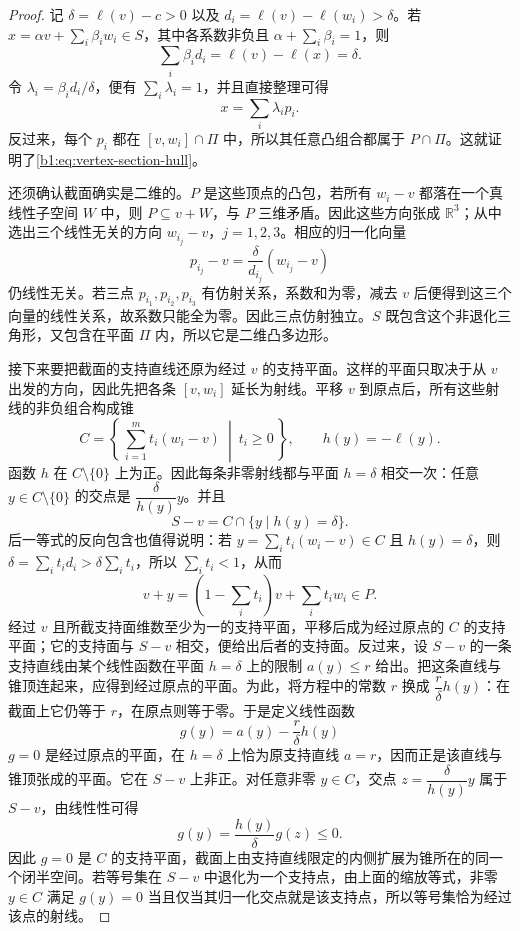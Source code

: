 \begin{proof}
	记 \(\delta=\ell(v)-c>0\) 以及 \(d_i=\ell(v)-\ell(w_i)>\delta\)。若 \(x=\alpha v+\sum_i\beta_iw_i\in S\)，其中各系数非负且 \(\alpha+\sum_i\beta_i=1\)，则
	\[
		\sum_i\beta_i d_i=\ell(v)-\ell(x)=\delta.
	\]
	令 \(\lambda_i=\beta_i d_i/\delta\)，便有 \(\sum_i\lambda_i=1\)，并且直接整理可得
	\[
		x=\sum_i\lambda_i p_i.
	\]
	反过来，每个 \(p_i\) 都在 \([v,w_i]\cap\Pi\) 中，所以其任意凸组合都属于 \(P\cap\Pi\)。这就证明了\eqref{b1:eq:vertex-section-hull}。

	还须确认截面确实是二维的。\(P\) 是这些顶点的凸包，若所有 \(w_i-v\) 都落在一个真线性子空间 \(W\) 中，则 \(P\subseteq v+W\)，与 \(P\) 三维矛盾。因此这些方向张成 \(\mathbb R^3\)；从中选出三个线性无关的方向 \(w_{i_j}-v\)，\(j=1,2,3\)。相应的归一化向量
	\[
		p_{i_j}-v=\frac{\delta}{d_{i_j}}(w_{i_j}-v)
	\]
	仍线性无关。若三点 \(p_{i_1},p_{i_2},p_{i_3}\) 有仿射关系，系数和为零，减去 \(v\) 后便得到这三个向量的线性关系，故系数只能全为零。因此三点仿射独立。\(S\) 既包含这个非退化三角形，又包含在平面 \(\Pi\) 内，所以它是二维凸多边形。

	接下来要把截面的支持直线还原为经过 \(v\) 的支持平面。这样的平面只取决于从 \(v\) 出发的方向，因此先把各条 \([v,w_i]\) 延长为射线。平移 \(v\) 到原点后，所有这些射线的非负组合构成锥
	\[
		C=\left\{\,\sum_{i=1}^m t_i(w_i-v)\ \middle|\ t_i\geq0\,\right\}, \qquad h(y)=-\ell(y).
	\]
	函数 \(h\) 在 \(C\setminus\{0\}\) 上为正。因此每条非零射线都与平面 \(h=\delta\) 相交一次：任意 \(y\in C\setminus\{0\}\) 的交点是 \(\dfrac{\delta}{h(y)}y\)。并且
	\[
		S-v=C\cap\{y\mid h(y)=\delta\}.
	\]
	后一等式的反向包含也值得说明：若 \(y=\sum_i t_i(w_i-v)\in C\) 且 \(h(y)=\delta\)，则 \(\delta=\sum_i t_i d_i>\delta\sum_i t_i\)，所以 \(\sum_i t_i<1\)，从而
	\[
		v+y=\left(1-\sum_i t_i\right)v+\sum_i t_iw_i\in P.
	\]
	经过 \(v\) 且所截支持面维数至少为一的支持平面，平移后成为经过原点的 \(C\) 的支持平面；它的支持面与 \(S-v\) 相交，便给出后者的支持面。反过来，设 \(S-v\) 的一条支持直线由某个线性函数在平面 \(h=\delta\) 上的限制 \(a(y)\leq r\) 给出。把这条直线与锥顶连起来，应得到经过原点的平面。为此，将方程中的常数 \(r\) 换成 \(\dfrac r\delta h(y)\)：在截面上它仍等于 \(r\)，在原点则等于零。于是定义线性函数
	\[
		g(y)=a(y)-\frac r\delta h(y)
	\]
	\(g=0\) 是经过原点的平面，在 \(h=\delta\) 上恰为原支持直线 \(a=r\)，因而正是该直线与锥顶张成的平面。它在 \(S-v\) 上非正。对任意非零 \(y\in C\)，交点 \(z=\dfrac{\delta}{h(y)}y\) 属于 \(S-v\)，由线性性可得
	\[
		g(y)=\frac{h(y)}{\delta}g(z)\leq0.
	\]
	因此 \(g=0\) 是 \(C\) 的支持平面，截面上由支持直线限定的内侧扩展为锥所在的同一个闭半空间。若等号集在 \(S-v\) 中退化为一个支持点，由上面的缩放等式，非零 \(y\in C\) 满足 \(g(y)=0\) 当且仅当其归一化交点就是该支持点，所以等号集恰为经过该点的射线。


\end{proof}
